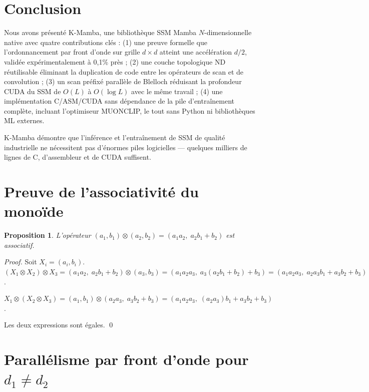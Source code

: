 \documentclass[10pt,onecolumn]{article}
\newtheorem{proposition}{Proposition}
\begin{document}
\section{Conclusion}

Nous avons présenté K-Mamba, une bibliothèque SSM Mamba $N$-dimensionnelle native
avec quatre contributions clés : (1) une preuve formelle que l'ordonnancement
par front d'onde sur grille $d \times d$ atteint une accélération $d/2$,
validée expérimentalement à 0,1\% près ; (2) une couche topologique ND réutilisable
éliminant la duplication de code entre les opérateurs de scan et de convolution ;
(3) un scan préfixé parallèle de Blelloch réduisant la profondeur CUDA du SSM
de $O(L)$ à $O(\log L)$ avec le même travail ;
(4) une implémentation C/ASM/CUDA sans dépendance de la pile d'entraînement complète,
incluant l'optimiseur MUONCLIP, le tout sans Python ni bibliothèques ML externes.

K-Mamba démontre que l'inférence et l'entraînement de SSM de qualité industrielle
ne nécessitent pas d'énormes piles logicielles —
quelques milliers de lignes de C, d'assembleur et de CUDA suffisent.

\appendix
\section{Preuve de l'associativité du monoïde}
\label{app:monoid}

\begin{proposition}
L'opérateur $(a_1,b_1) \otimes (a_2,b_2) = (a_1 a_2,\; a_2 b_1 + b_2)$
est associatif.
\end{proposition}

\begin{proof}
Soit $X_i = (a_i, b_i)$.
$(X_1 \otimes X_2) \otimes X_3
= (a_1 a_2,\; a_2 b_1 + b_2) \otimes (a_3, b_3)
= (a_1 a_2 a_3,\; a_3(a_2 b_1 + b_2) + b_3)
= (a_1 a_2 a_3,\; a_2 a_3 b_1 + a_3 b_2 + b_3)$.

$X_1 \otimes (X_2 \otimes X_3)
= (a_1, b_1) \otimes (a_2 a_3,\; a_3 b_2 + b_3)
= (a_1 a_2 a_3,\; (a_2 a_3) b_1 + a_3 b_2 + b_3)$.

Les deux expressions sont égales. \qed
\end{proof}

\section{Parallélisme par front d'onde pour $d_1 \neq d_2$}
\label{app:wavefront_rect}
\end{document}
